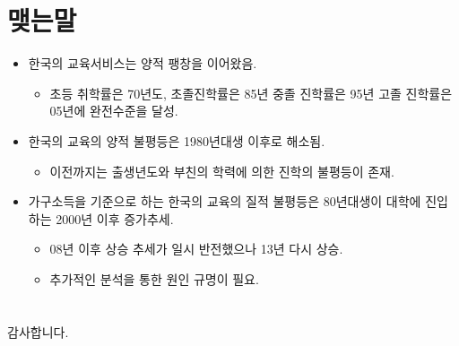 \documentclass[aspectratio=169,xcolor=dvipsnames,handout]{beamer}
\begin{document}
\section{맺는말}%
\begin{frame}[<+->]
    \begin{itemize}
        \item 한국의 교육서비스는 양적 팽창을 이어왔음.
            \begin{itemize}[<+->]
                \item 초등 취학률은 70년도, 초졸진학률은 85년 중졸 진학률은 95년 고졸 진학률은 05년에 완전수준을 달성.
            \end{itemize}
        \item 한국의 교육의 양적 불평등은 1980년대생 이후로 해소됨.
            \begin{itemize}[<+->]
                \item 이전까지는 출생년도와 부친의 학력에 의한 진학의 불평등이 존재.
            \end{itemize}
        \item 가구소득을 기준으로 하는 한국의 교육의 질적 불평등은 80년대생이 대학에 진입하는 2000년 이후 증가추세.
            \begin{itemize}[<+->]
                \item 08년 이후 상승 추세가 일시 반전했으나 13년 다시 상승.
                \item 추가적인 분석을 통한 원인 규명이 필요.
            \end{itemize}
    \end{itemize}
\end{frame}

\section*{}%
\begin{frame}
    \centering
    \huge
    감사합니다.
\end{frame}
\end{document}
